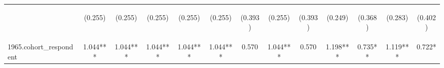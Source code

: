 \begin{center}
\begin{tabular}{lcccccccccccc}
\vspace{4pt} & \begin{footnotesize}(0.255)\end{footnotesize} & \begin{footnotesize}(0.255)\end{footnotesize} & \begin{footnotesize}(0.255)\end{footnotesize} & \begin{footnotesize}(0.255)\end{footnotesize} & \begin{footnotesize}(0.255)\end{footnotesize} & \begin{footnotesize}(0.393)\end{footnotesize} & \begin{footnotesize}(0.255)\end{footnotesize} & \begin{footnotesize}(0.393)\end{footnotesize} & \begin{footnotesize}(0.249)\end{footnotesize} & \begin{footnotesize}(0.368)\end{footnotesize} & \begin{footnotesize}(0.283)\end{footnotesize} & \begin{footnotesize}(0.402)\end{footnotesize} \\
1965.cohort\_respondent & 1.044*** & 1.044*** & 1.044*** & 1.044*** & 1.044*** & 0.570 & 1.044*** & 0.570 & 1.198*** & 0.735** & 1.119*** & 0.722* \\

\end{tabular}
\end{center}
